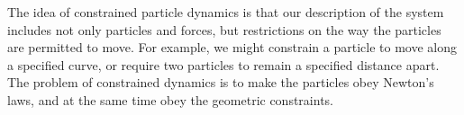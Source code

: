 The idea of constrained particle dynamics is that our description of the system includes not only
particles and forces, but restrictions on the way the particles are permitted to move. For example,
we might constrain a particle to move along a specified curve, or require two particles to remain
a specified distance apart. The problem of constrained dynamics is to make the particles obey
Newton’s laws, and at the same time obey the geometric constraints.